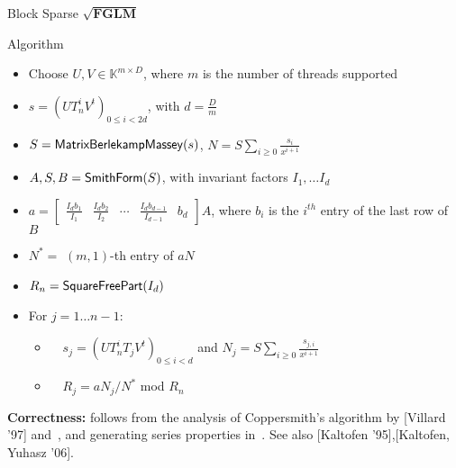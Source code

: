 \documentclass[final]{beamer}
\newlength{\twocolwid}
\begin{document}
\begin{frame}[t]
\begin{columns}[t]
\begin{column}{\twocolwid}
\begin{block}{Block Sparse $\mathbf{\sqrt{FGLM}}$}
	\begin{alertblock}{Algorithm}
		\begin{itemize}
			\item[] Choose $U,V \in \mathbb{K}^{m \times D}$, where $m$ is the number of threads supported
			\item[] $s= (UT_n^iV^t)_{0 \le i < 2d}$, with $d = \frac{D}{m}$
			\item[] $S = {\sf MatrixBerlekampMassey}(s)$, $N = S\sum_{i\ge 0} \frac{s_i}{x^{i+1}}$
			\item[] $A,S,B={\sf SmithForm}(S)$, with invariant factors $I_1,\dots I_d$
                        \item[] $a = \begin{bmatrix}
			\frac{I_db_1}{I_1} & \frac{I_db_2}{I_2}& \cdots&\frac{I_db_{d-1}}{I_{d-1}}&b_d
			\end{bmatrix} A$, where $b_i$ is the $i^{th}$ entry of the last row of $B$
			\item[]  $N^*=$ $(m,1)$-th entry of $aN$
                        \item[]  $R_n={\sf SquareFreePart}(I_d)$
			\item[] For $j = 1 \dots n-1$:
			\begin{itemize}
			\item[] ~~$s_j = (UT_n^i T_j V^t)_{0 \le i < d}$ and $N_j = S\sum_{i\ge 0} \frac{s_{j,i}}{x^{i+1}}$
			\item[] ~~$R_j=a N_j/N^*$ mod $R_n$
			\end{itemize}
		\end{itemize}
	\end{alertblock}

  \textbf{Correctness:} follows from the analysis of Coppersmith's algorithm by [Villard '97]
and~\cite{KaVi04}, and generating series properties in~\cite{BoSaSc03}.
See also [Kaltofen '95],[Kaltofen,
   Yuhasz '06].



\end{block}
\end{column}
\end{columns}
\end{frame}
\end{document}
